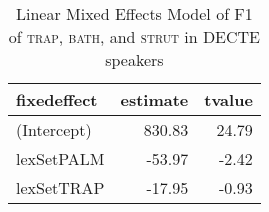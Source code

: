 \begin{table}[ht]
\centering
\begin{tabular}{lrr}
  \hline
fixedeffect & estimate & tvalue \\ 
  \hline
(Intercept) & 830.83 & 24.79 \\ 
  lexSetPALM & -53.97 & -2.42 \\ 
  lexSetTRAP & -17.95 & -0.93 \\ 
   \hline
\end{tabular}
\caption{Linear Mixed Effects Model of F1 of \textsc{trap}, \textsc{bath}, and \textsc{strut} in DECTE speakers \label{tbl:TBF1DE}} 
\end{table}
